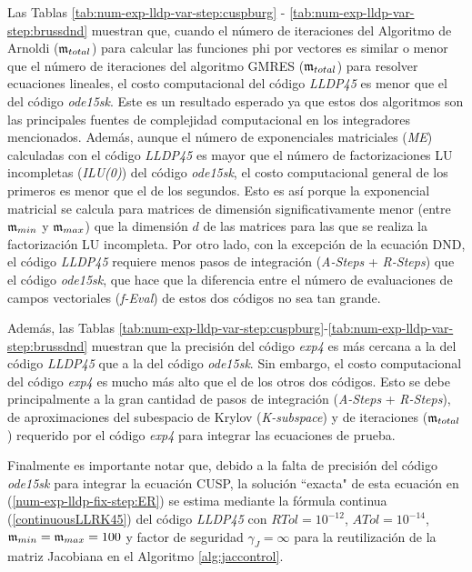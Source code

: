 Las Tablas \ref{tab:num-exp-lldp-var-step:cuspburg} - \ref{tab:num-exp-lldp-var-step:brussdnd} muestran que, cuando el número de iteraciones del Algoritmo de Arnoldi ($\mathfrak{m}_{total}$) para calcular las funciones phi por vectores es similar o menor que el número de iteraciones del algoritmo GMRES ($\mathfrak{m}_{total}$) para resolver ecuaciones lineales, el costo computacional del código \emph{LLDP45} es menor que el del código \emph{ode15sk}. Este es un resultado esperado ya que estos dos algoritmos son las principales fuentes de complejidad computacional en los integradores mencionados. Además, aunque el número de exponenciales matriciales (\textit{ME}) calculadas con el código \emph{LLDP45} es mayor que el número de factorizaciones LU incompletas (\textit{ILU(0)}) del código \emph{ode15sk}, el costo computacional general de los primeros es menor que el de los segundos. Esto es así porque la exponencial matricial se calcula para matrices de dimensión significativamente menor (entre $\mathfrak{m}_{min}$ y $\mathfrak{m}_{max}$) que la dimensión $d$ de las matrices para las que se realiza la factorización LU incompleta. Por otro lado, con la excepción de la ecuación DND, el código \emph{LLDP45} requiere menos pasos de integración (\textit{A-Steps} + \textit{R-Steps}) que el código \emph{ode15sk}, que hace que la diferencia entre el número de evaluaciones de campos vectoriales (\textit{f-Eval}) de estos dos códigos no sea tan grande.

Además, las Tablas \ref{tab:num-exp-lldp-var-step:cuspburg}-\ref{tab:num-exp-lldp-var-step:brussdnd} muestran que la precisión del código \emph{exp4} es más cercana a la del código \emph{LLDP45} que a la del código \emph{ode15sk}. Sin embargo, el costo computacional del código \emph{exp4} es mucho más alto que el de los otros dos códigos. Esto se debe principalmente a la gran cantidad de pasos de integración (\textit{A-Steps} + \textit{R-Steps}), de aproximaciones del subespacio de Krylov (\textit{K-subspace}) y de iteraciones ($\mathfrak{m}_ {total}$) requerido por el código \emph{exp4} para integrar las ecuaciones de prueba.

Finalmente es importante notar que, debido a la falta de precisión del código \emph{ode15sk} para integrar la ecuación CUSP, la solución ``exacta" de esta ecuación en (\ref{num-exp-lldp-fix-step:ER}) se estima mediante la fórmula continua (\ref{continuousLLRK45}) del código \emph{LLDP45} con $RTol = 10^{-12}$, $ATol = 10^{-14}$, $\mathfrak{m}_{min} = \mathfrak{m}_{max} = 100$ y factor de seguridad $\gamma_J=\infty$ para la reutilización de la matriz Jacobiana en el Algoritmo \ref{alg:jaccontrol}.